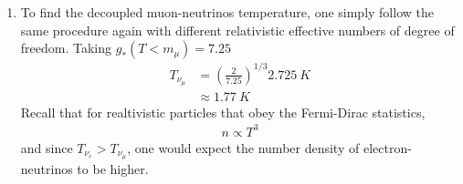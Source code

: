 \begin{enumerate}[label=\alph*)]
\item To find the decoupled muon-neutrinos temperature, one simply follow the same procedure again with different relativistic effective numbers of degree of freedom. Taking $g_{\ast} (T<m_{\mu})=  7.25$ 
\begin{align}
T_{\nu_\mu} &= \left(\frac{2}{7.25}\right)^{1/3}\SI{2.725}{K}\\
&\approx \SI{1.77}{K}
\end{align}
Recall that for realtivistic particles that obey the Fermi-Dirac statistics, 
\begin{align}
n \propto T^3
\end{align}
and since $T_{\nu_e} > T_{\nu_\mu}$, one would expect the number density of electron-neutrinos to be higher.


\end{enumerate}